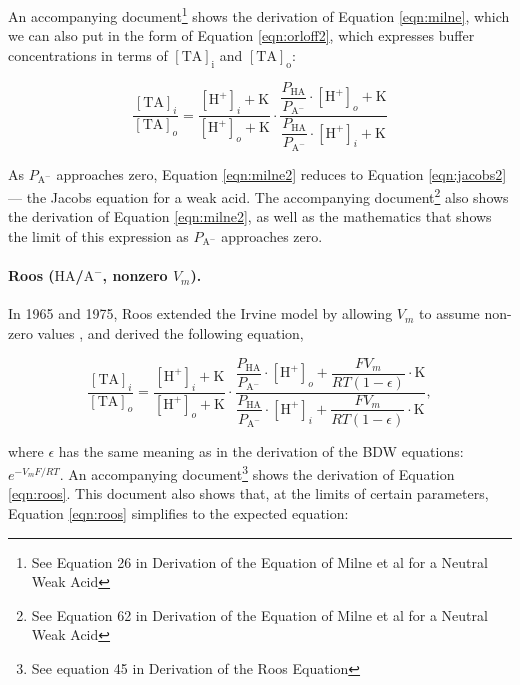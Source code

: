 \documentclass[fleqn,10pt]{physiome}
\begin{document}
An accompanying document\footnote{See Equation 26 in Derivation of the Equation of Milne et al for a Neutral Weak Acid} shows the derivation of Equation \ref{eqn:milne}, which we can also put in the form of Equation \ref{eqn:orloff2}, which expresses buffer concentrations in terms of $\mathrm{[TA]_i}$ and $\mathrm{[TA]_o}$:

\begin{equation}
\dfrac{\mathrm{[TA]}_i}{\mathrm{[TA]}_o}=\dfrac{\mathrm{[H^+]}_i+\mathrm{K}}{\mathrm{[H^+]}_o+\mathrm{K}}\cdot \dfrac{\dfrac{P_\mathrm{HA}}{P_\mathrm{A^-}}\cdot\mathrm{[H^+]}_o+\mathrm{K}}{\dfrac{P_\mathrm{HA}}{P_\mathrm{A^-}}\cdot\mathrm{[H^+]}_i+\mathrm{K}}
\label{eqn:milne2}
\end{equation}

As $P_\mathrm{A^-}$ approaches zero, Equation \ref{eqn:milne2} reduces to Equation \ref{eqn:jacobs2} --- the Jacobs equation for a weak acid. The accompanying document\footnote{See Equation 62 in Derivation of the Equation of Milne et al for a Neutral Weak Acid} also shows the derivation of Equation \ref{eqn:milne2}, as well as the mathematics that shows the limit of this expression as $P_\mathrm{A^-}$ approaches zero.


\paragraph{Roos ($\mathrm{HA}$/$\mathrm{A^-}$, nonzero $V_m$).} In 1965 and 1975, Roos extended the Irvine model by allowing $V_m$ to assume non-zero values \citep{roos1965intracellular,roos1975intracellular}, and derived the following equation,

\begin{equation}
\dfrac{\mathrm{[TA]}_i}{\mathrm{[TA]}_o}=\dfrac{\mathrm{[H^+]}_i+\mathrm{K}}{\mathrm{[H^+]}_o+\mathrm{K}}\cdot \dfrac{\dfrac{P_\mathrm{HA}}{P_\mathrm{A^-}}\cdot\mathrm{[H^+]}_o+\dfrac{FV_m}{RT(1-\epsilon)}\cdot\mathrm{K}}{\dfrac{P_\mathrm{HA}}{P_\mathrm{A^-}}\cdot\mathrm{[H^+]}_i+\dfrac{FV_m}{RT(1-\epsilon)}\cdot\mathrm{K}},
\label{eqn:roos}
\end{equation}

where $\epsilon$ has the same meaning as in the derivation of the BDW equations: $e^{-V_mF/RT}$. An accompanying document\footnote{See equation 45 in Derivation of the Roos Equation} shows the derivation of Equation \ref{eqn:roos}. This document also shows that, at the limits of certain parameters, Equation \ref{eqn:roos} simplifies to the expected equation:
\end{document}
